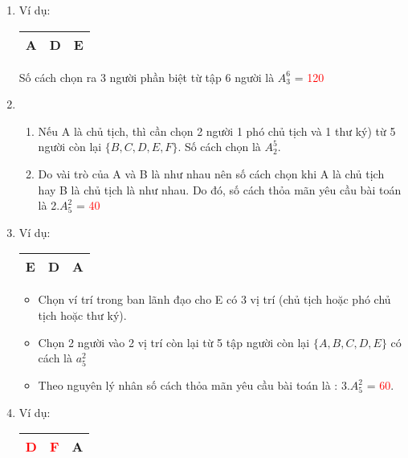 \documentclass[12pt,oneside]{book}
\begin{document}
\begin{enumerate}[label =\alph*)]
\item Ví dụ:
\begin{center}
    \begin{tabular}{|c|c|c|}
         \hline
         A&D&E  \\
         \hline
    \end{tabular}
\end{center}
Số cách chọn ra 3 người phần biệt từ tập 6 người là $A_3^6$ = \textcolor{red}{120}
    \item \indent\vspace{0.2cm}
    \begin{enumerate}[label = $\bullet$]
        \item Nếu A là chủ tịch, thì cần chọn 2 người 1 phó chủ tịch và 1 thư ký) từ 5 người còn lại $\{B, C, D, E, F\}$. Số cách chọn là $A_2^5$.
        \item Do vài trò của A và B là như nhau nên số cách chọn khi A là chủ tịch hay B là chủ tịch là như nhau. Do đó, số cách thỏa mãn yêu cầu bài toán là 2.$A_5^2 $ = \textcolor{red}{40}
    \end{enumerate}
    \item Ví dụ:
    \begin{center}
        \begin{tabular}{|c|c|c|}
             \hline
             E&D&A  \\
             \hline
        \end{tabular}
    \end{center}
    \begin{itemize}
        \item Chọn ví trí trong ban lãnh đạo cho E có 3 vị trí (chủ tịch hoặc phó chủ tịch hoặc thư ký).
        \item Chọn 2 người vào 2 vị trí còn lại từ 5 tập người còn lại $\{A, B, C,D,E\}$ có cách là $a_5^2$
        \item Theo nguyên lý nhân số cách thỏa mãn yêu cầu bài toán là : 3.$A_5^2$ = \textcolor{red}{60}.
    \end{itemize}
    \item Ví dụ:
    \begin{center}
        \begin{tabular}{|c|c|c|}
        \hline
             \textcolor{red}{D}&\textcolor{red}{F}&A  \\
        \hline
        \end{tabular}
    \end{center}

\end{enumerate}
\end{document}

